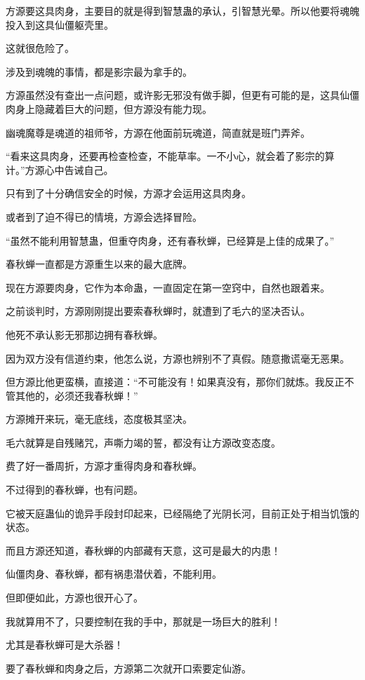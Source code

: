 \begin{this_body}
方源要这具肉身，主要目的就是得到智慧蛊的承认，引智慧光晕。所以他要将魂魄投入到这具仙僵躯壳里。

这就很危险了。

涉及到魂魄的事情，都是影宗最为拿手的。

方源虽然没有查出一点问题，或许影无邪没有做手脚，但更有可能的是，这具仙僵肉身上隐藏着巨大的问题，但方源没有能力现。

幽魂魔尊是魂道的祖师爷，方源在他面前玩魂道，简直就是班门弄斧。

“看来这具肉身，还要再检查检查，不能草率。一不小心，就会着了影宗的算计。”方源心中告诫自己。

只有到了十分确信安全的时候，方源才会运用这具肉身。

或者到了迫不得已的情境，方源会选择冒险。

“虽然不能利用智慧蛊，但重夺肉身，还有春秋蝉，已经算是上佳的成果了。”

春秋蝉一直都是方源重生以来的最大底牌。

现在方源要肉身，它作为本命蛊，一直固定在第一空窍中，自然也跟着来。

之前谈判时，方源刚刚提出要索春秋蝉时，就遭到了毛六的坚决否认。

他死不承认影无邪那边拥有春秋蝉。

因为双方没有信道约束，他怎么说，方源也辨别不了真假。随意撒谎毫无恶果。

但方源比他更蛮横，直接道：“不可能没有！如果真没有，那你们就炼。我反正不管其他的，必须还我春秋蝉！”

方源摊开来玩，毫无底线，态度极其坚决。

毛六就算是自残赌咒，声嘶力竭的誓，都没有让方源改变态度。

费了好一番周折，方源才重得肉身和春秋蝉。

不过得到的春秋蝉，也有问题。

它被天庭蛊仙的诡异手段封印起来，已经隔绝了光阴长河，目前正处于相当饥饿的状态。

而且方源还知道，春秋蝉的内部藏有天意，这可是最大的内患！

仙僵肉身、春秋蝉，都有祸患潜伏着，不能利用。

但即便如此，方源也很开心了。

我就算用不了，只要控制在我的手中，那就是一场巨大的胜利！

尤其是春秋蝉可是大杀器！

要了春秋蝉和肉身之后，方源第二次就开口索要定仙游。


\end{this_body}
